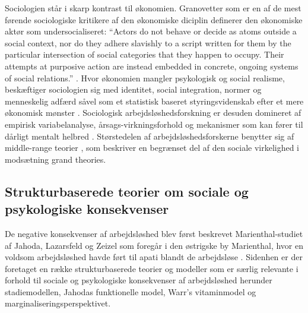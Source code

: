 Sociologien står i skarp kontrast til økonomien. Granovetter som er en af de mest førende sociologiske kritikere af den økonomiske diciplin definerer den økonomiske aktør som undersocialiseret: “Actors do not behave or decide as atoms outside a social context, nor do they adhere slavishly to a script written for them by the particular intersection of social categories that they happen to occupy. Their attempts at purposive action are instead embedded in concrete, ongoing systems of social relations.” \parencite[487]{Granovetter1985}. %
Hvor økonomien mangler psykologisk og social realisme, beskæftiger sociologien sig med identitet, social integration, normer og menneskelig adfærd såvel som et statistisk baseret styringsvidenskab efter et mere økonomisk mønster \parencite[36]{Halvorsen1999}. Sociologisk arbejdsløshedsforskning er desuden domineret af empirisk variabelanalyse, årsags-virkningsforhold og mekanismer som kan fører til dårligt mentalt helbred \parencite[38]{Halvorsen1999}. Størstedelen af arbejdsløshedsforskerne benytter sig af middle-range teorier \parencite[9]{Hedstroem2005}, som beskriver en begrænset del af den sociale virkelighed i modsætning grand theories. %

\parencite{Granovetter1995}


\subsection{Strukturbaserede teorier om sociale og psykologiske konsekvenser}

De negative konsekvenser af arbejdsløshed blev først beskrevet Marienthal-studiet af Jahoda, Lazarsfeld og Zeizel som foregår i den østrigske by Marienthal, hvor en voldsom arbejdsløshed havde ført til apati blandt de arbejdsløse \parencite[vii]{Lazarsfeld1971}. Sidenhen er der foretaget en række strukturbaserede teorier og modeller som er særlig relevante i forhold til sociale og psykologiske konsekvenser af arbejdsløshed herunder stadiemodellen, Jahodas funktionelle model, Warr's vitaminmodel og marginaliseringsperspektivet.

